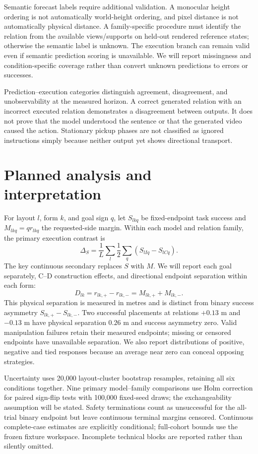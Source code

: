 \documentclass[11pt]{article}
\begin{document}
Semantic forecast labels require additional validation. A monocular height ordering is not automatically world-height ordering, and pixel distance is not automatically physical distance. A family-specific procedure must identify the relation from the available views/supports on held-out rendered reference states; otherwise the semantic label is unknown. The execution branch can remain valid even if semantic prediction scoring is unavailable. We will report missingness and condition-specific coverage rather than convert unknown predictions to errors or successes.

Prediction--execution categories distinguish agreement, disagreement, and unobservability at the measured horizon. A correct generated relation with an incorrect executed relation demonstrates a disagreement between outputs. It does not prove that the model understood the sentence or that the generated video caused the action. Stationary pickup phases are not classified as ignored instructions simply because neither output yet shows directional transport.

\section{Planned analysis and interpretation}
For layout $l$, form $k$, and goal sign $q$, let $S_{lkq}$ be fixed-endpoint task success and $M_{lkq}=q r_{lkq}$ the requested-side margin. Within each model and relation family, the primary execution contrast is
\begin{equation}
\Delta_S = \frac{1}{L}\sum_l\frac{1}{2}\sum_q(S_{lIq}-S_{lCq}).
\end{equation}
The key continuous secondary replaces $S$ with $M$. We will report each goal separately, C--D construction effects, and directional endpoint separation within each form:
\begin{equation}
D_{lk}=r_{lk,+}-r_{lk,-}=M_{lk,+}+M_{lk,-}.
\end{equation}
This physical separation is measured in metres and is distinct from binary success asymmetry $S_{lk,+}-S_{lk,-}$. Two successful placements at relations $+0.13$ m and $-0.13$ m have physical separation $0.26$ m and success asymmetry zero. Valid manipulation failures retain their measured endpoints; missing or censored endpoints have unavailable separation. We also report distributions of positive, negative and tied responses because an average near zero can conceal opposing strategies.

Uncertainty uses 20,000 layout-cluster bootstrap resamples, retaining all six conditions together. Nine primary model--family comparisons use Holm correction for paired sign-flip tests with 100,000 fixed-seed draws; the exchangeability assumption will be stated. Safety terminations count as unsuccessful for the all-trial binary endpoint but leave continuous terminal margins censored. Continuous complete-case estimates are explicitly conditional; full-cohort bounds use the frozen fixture workspace. Incomplete technical blocks are reported rather than silently omitted.
\end{document}
